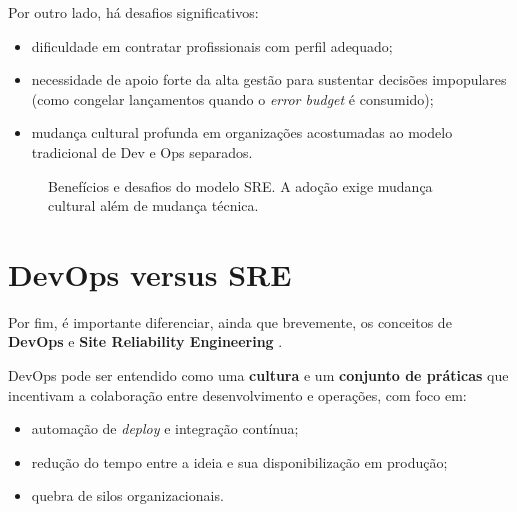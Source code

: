\documentclass[12pt,a4paper]{report}
\begin{document}
Por outro lado, há desafios significativos:
\begin{itemize}[nosep]
    \item dificuldade em contratar profissionais com perfil adequado;
    \item necessidade de apoio forte da alta gestão para sustentar decisões
    impopulares (como congelar lançamentos quando o \emph{error budget} é
    consumido);
    \item mudança cultural profunda em organizações acostumadas ao modelo
    tradicional de Dev e Ops separados.
\end{itemize}

\begin{figure}[h]
    \centering
    \caption{Benefícios e desafios do modelo SRE. A adoção exige mudança cultural além de mudança técnica.}
\end{figure}

\section{DevOps versus SRE}

Por fim, é importante diferenciar, ainda que brevemente, os conceitos de
\textbf{DevOps} \cite{kim2018devops, humble2010} e \textbf{Site Reliability Engineering} \cite{beyer2016sre}.

DevOps pode ser entendido como uma \textbf{cultura} e um \textbf{conjunto de
práticas} que incentivam a colaboração entre desenvolvimento e operações, com
foco em:
\begin{itemize}[nosep]
    \item automação de \emph{deploy} e integração contínua;
    \item redução do tempo entre a ideia e sua disponibilização em produção;
    \item quebra de silos organizacionais.
\end{itemize}
\end{document}
